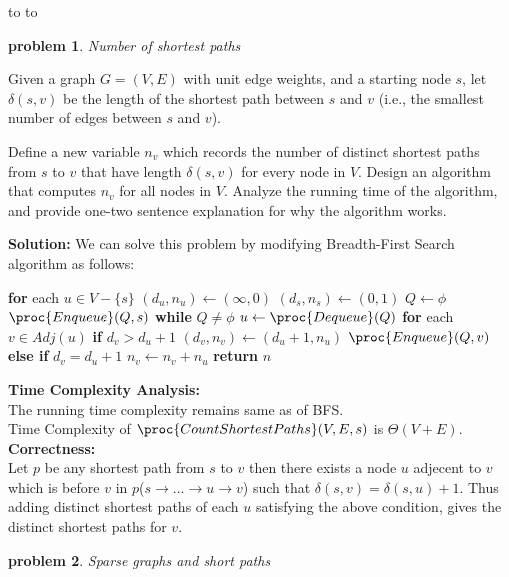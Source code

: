 \documentclass[11pt]{article}
\newcommand{\handout}{
   \renewcommand{\thepage}{H\hnumber-\arabic{page}}%
   \noindent%
   \begin{center}%
      \vbox{%
    \hbox to \columnwidth {\sc{\course} --- abhi shelat \hfill}%
    \vspace{-2mm}%
    \hbox to \columnwidth {\sc due \MakeLowercase{\duedate} \duelocation\hfill {\Huge\color{mdb}H\hnumber.\yourname}}%
      }
   \end{center}
   \vspace*{2mm}
}
\newtheorem{problem}{\sc\color{cit}problem}
\begin{document}
\handout


\begin{problem}Number of shortest paths\end{problem}
Given a graph $G=(V,E)$ with unit edge weights, and a starting node $s$, let $\delta(s,v)$ be the length of the shortest path between $s$ and $v$ (i.e., the smallest number of edges between $s$ and $v$).

Define a new variable $n_{v}$ which records the number of distinct shortest paths from $s$ to $v$ that have length $\delta(s,v)$ for every node in $V$.  Design an algorithm that computes $n_v$ for all nodes in $V$. Analyze the running time of the algorithm, and provide one-two sentence explanation for why the algorithm works.

\hfill

\noindent\textbf{Solution:}
We can solve this problem by modifying Breadth-First Search algorithm as follows:
\begin{codebox}
    \li \textbf{for} each $u \in V-\{s\}$
    \li \quad $(d_u, n_u) \leftarrow (\infty, 0)$
    \li $(d_s, n_s) \leftarrow (0, 1)$
    \li $Q \leftarrow \phi$
    \li $\proc{Enqueue}(Q,s)$
    \li \textbf{while} $Q \neq \phi$
    \li \quad $u \leftarrow \proc{Dequeue}(Q)$
    \li \quad \textbf{for} each $v \in Adj(u)$
    \li \quad \quad \textbf{if} $d_v > d_u + 1$
    \li \quad \quad \quad $(d_v, n_v) \leftarrow (d_u + 1, n_u)$
    \li \quad \quad \quad $\proc{Enqueue}(Q,v)$
    \li \quad \quad \textbf{else if} $d_v = d_u + 1$
    \li \quad \quad \quad $n_v \leftarrow n_v+n_u$
    \li \textbf{return} $n$
\end{codebox}

\textbf{Time Complexity Analysis:}\\
The running time complexity remains same as of BFS.\\
Time Complexity of $\proc{CountShortestPaths}(V,E,s)$ is $\Theta (V+E)$.\\

\textbf{Correctness:}\\
Let $p$ be any shortest path from $s$ to $v$ then there exists a node $u$ adjecent to $v$ which is before $v$ in $p$($s \rightarrow \ldots \rightarrow u \rightarrow v$) such that $\delta(s,v) = \delta(s,u)+1$. Thus adding distinct shortest paths of each $u$ satisfying the above condition, gives the distinct shortest paths for $v$.
\newpage
\begin{problem}Sparse graphs and short paths\end{problem}
\end{document}
